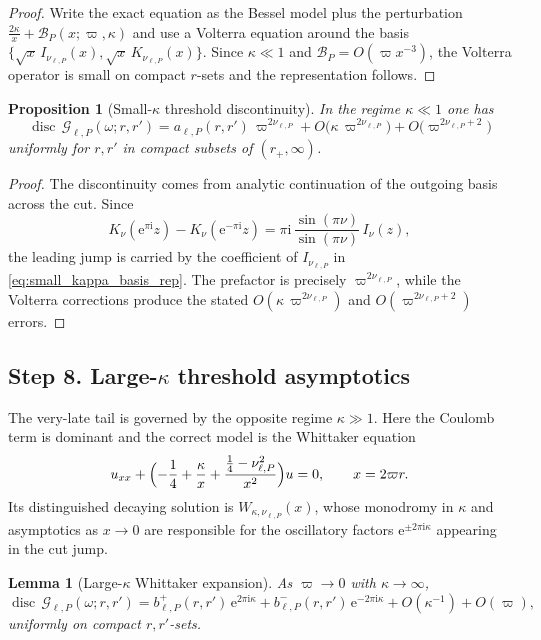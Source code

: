\documentclass[12pt]{article}
\numberwithin{equation}{section}
\theoremstyle{plain}
\newtheorem{proposition}[theorem]{Proposition}
\newtheorem{lemma}[theorem]{Lemma}
\theoremstyle{definition}
\theoremstyle{remark}
\newcommand{\ii}{\mathrm i}
\newcommand{\ee}{\mathrm e}
\newcommand{\disc}{\operatorname{disc}}
\newcommand{\cG}{\mathcal G}
\newcommand{\cB}{\mathcal B}
\newcommand{\om}{\omega}
\newcommand{\vp}{\varpi}
\newcommand{\kap}{\kappa}
\begin{document}
\begin{proof}
Write the exact equation as the Bessel model plus the perturbation $\frac{2\kap}{x}+\cB_P(x;\vp,\kap)$ and use a Volterra equation around the basis $\{\sqrt{x}\,I_{\nu_{\ell,P}}(x),\sqrt{x}\,K_{\nu_{\ell,P}}(x)\}$.  Since $\kap\ll1$ and $\cB_P=O(\vp x^{-3})$, the Volterra operator is small on compact $r$-sets and the representation follows.
\end{proof}

\begin{proposition}[Small-$\kap$ threshold discontinuity]\label{prop:small_kappa_disc}
In the regime $\kap\ll1$ one has
\begin{equation}\label{eq:small_kappa_disc}
   \disc\,\cG_{\ell,P}(\om;r,r')
   =
   a_{\ell,P}(r,r')\,\vp^{2\nu_{\ell,P}}
   +
   O\!\bigl(\kap\,\vp^{2\nu_{\ell,P}}\bigr)
   +
   O\!\bigl(\vp^{2\nu_{\ell,P}+2}\bigr)
\end{equation}
uniformly for $r,r'$ in compact subsets of $(r_+,\infty)$.
\end{proposition}

\begin{proof}
The discontinuity comes from analytic continuation of the outgoing basis across the cut.  Since
\[
   K_\nu(\ee^{\pi\ii}z)-K_\nu(\ee^{-\pi\ii}z)
   =\pi\ii\,\frac{\sin(\pi\nu)}{\sin(\pi\nu)}\,I_\nu(z),
\]
the leading jump is carried by the coefficient of $I_{\nu_{\ell,P}}$ in \eqref{eq:small_kappa_basis_rep}.  The prefactor is precisely $\vp^{2\nu_{\ell,P}}$, while the Volterra corrections produce the stated $O(\kap\,\vp^{2\nu_{\ell,P}})$ and $O(\vp^{2\nu_{\ell,P}+2})$ errors.
\end{proof}

\subsection*{Step 8. Large-$\kap$ threshold asymptotics}

The very-late tail is governed by the opposite regime $\kap\gg1$.  Here the Coulomb term is dominant and the correct model is the Whittaker equation
\[
   u_{xx}+\Bigl(-\frac14+\frac{\kap}{x}+\frac{\frac14-\nu_{\ell,P}^2}{x^2}\Bigr)u=0,
   \qquad x=2\vp r.
\]
Its distinguished decaying solution is $W_{\kap,\nu_{\ell,P}}(x)$, whose monodromy in $\kap$ and asymptotics as $x\to0$ are responsible for the oscillatory factors $\ee^{\pm2\pi\ii\kap}$ appearing in the cut jump.

\begin{lemma}[Large-$\kap$ Whittaker expansion]\label{lem:large_kappa_detailed}
As $\vp\to0$ with $\kap\to\infty$,
\[
   \disc\,\cG_{\ell,P}(\om;r,r')
   =
   b_{\ell,P}^+(r,r')\,\ee^{2\pi\ii\kap}
   +
   b_{\ell,P}^-(r,r')\,\ee^{-2\pi\ii\kap}
   +
   O(\kap^{-1})+O(\vp),
\]
uniformly on compact $r,r'$-sets.
\end{lemma}
\end{document}

